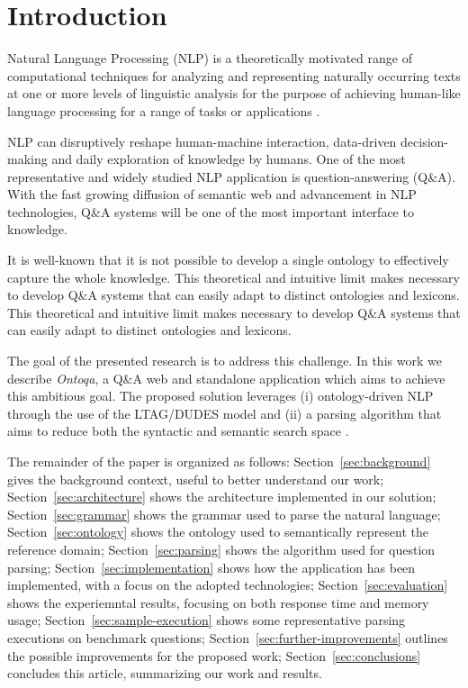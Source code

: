\section{Introduction}
\label{sec:introduction}

Natural Language Processing (NLP) is a theoretically motivated range of
computational techniques for analyzing and representing naturally occurring texts
at one or more levels of linguistic analysis for the purpose of achieving human-like
language processing for a range of tasks or applications \cite{liddy2001natural}.

NLP can disruptively reshape human-machine interaction, data-driven decision-making and daily exploration of knowledge by humans.
%
One of the most representative and widely studied NLP application is question-answering (Q\&A).
%
With the fast growing diffusion of semantic web and advancement in NLP technologies, Q\&A systems will be one of the most important interface to knowledge.

It is well-known that it is not possible to develop a single ontology to effectively capture the whole knowledge.
%
This theoretical and intuitive limit makes necessary to develop Q\&A systems that can easily adapt to distinct ontologies and lexicons.
%
This theoretical and intuitive limit makes necessary to develop Q\&A systems that can easily adapt to distinct ontologies and lexicons.

The goal of the presented research is to address this  challenge.
%
In this work we describe \textit{Ontoqa}, a Q\&A web and standalone application which aims to achieve this ambitious goal.
%
The proposed solution leverages (i) ontology-driven NLP through the use of the LTAG/DUDES model and (ii) a parsing algorithm that aims to reduce both the syntactic and  semantic search space \cite{cimiano2014ontology}.


The remainder of the paper is organized as follows:
Section~\ref{sec:background} gives the background context, useful to better understand our work;
Section~\ref{sec:architecture} shows the architecture implemented in our solution;
Section~\ref{sec:grammar} shows the grammar used to parse the natural language;
Section~\ref{sec:ontology} shows the ontology used to semantically represent the reference domain;
Section~\ref{sec:parsing} shows the algorithm used for question parsing;
Section~\ref{sec:implementation} shows how the application has been implemented, with a focus on the adopted technologies;
Section~\ref{sec:evaluation} shows the experiemntal results, focusing on both response time and memory usage;
Section~\ref{sec:sample-execution} shows some representative parsing executions on benchmark questions;
Section~\ref{sec:further-improvements} outlines the possible improvements for the proposed work;
Section~\ref{sec:conclusions} concludes this article, summarizing our work and results.